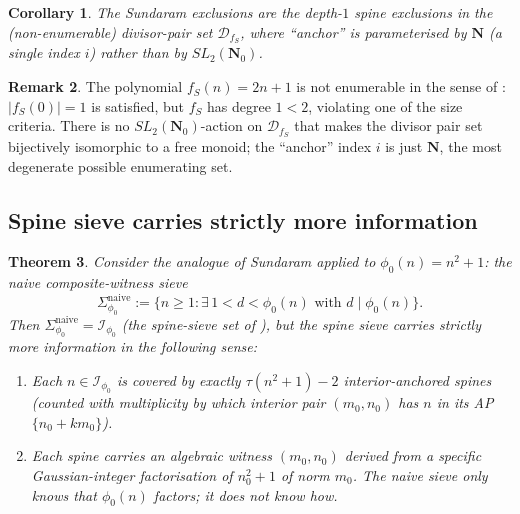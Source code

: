 \documentclass[11pt]{article}
\newtheorem{theorem}{Theorem}[section]
\newtheorem{corollary}[theorem]{Corollary}
\theoremstyle{definition}
\newtheorem{remark}[theorem]{Remark}
\newcommand{\N}{\mathbf{N}}
\newcommand{\Nz}{\mathbf{N}_0}
\newcommand{\SLNz}{SL_2(\Nz)}
\newcommand{\Iset}{\mathcal{I}_{\phi_0}}
\begin{document}
\begin{corollary}\label{cor:sundaram-as-spine}
The Sundaram exclusions are the depth-$1$ spine exclusions in the (non-enumerable) divisor-pair set $\mathcal{D}_{f_S}$, where ``anchor'' is parameterised by $\N$ (a single index $i$) rather than by $\SLNz$.
\end{corollary}

\begin{remark}\label{rem:non-enumerable}
The polynomial $f_S(n) = 2n+1$ is not enumerable in the sense of \cite[Defn.~2.1]{shakov}: $|f_S(0)| = 1$ is satisfied, but $f_S$ has degree $1 < 2$, violating one of the size criteria. There is no $\SLNz$-action on $\mathcal{D}_{f_S}$ that makes the divisor pair set bijectively isomorphic to a free monoid; the ``anchor'' index $i$ is just $\N$, the most degenerate possible enumerating set.
\end{remark}

\subsection{Spine sieve carries strictly more information}

\begin{theorem}\label{thm:spine-vs-sundaram}
Consider the analogue of Sundaram applied to $\phi_0(n) = n^2+1$: the naive composite-witness sieve
\[
\Sigma_{\phi_0}^{\mathrm{naive}} := \{n \ge 1 : \exists\, 1 < d < \phi_0(n) \text{ with } d \mid \phi_0(n)\}.
\]
Then $\Sigma_{\phi_0}^{\mathrm{naive}} = \Iset$ (the spine-sieve set of \cite[Defn.~3.4]{B8}), but the spine sieve carries strictly more information in the following sense:
\begin{enumerate}
\item Each $n \in \Iset$ is covered by exactly $\tau(n^2+1) - 2$ interior-anchored spines (counted with multiplicity by which interior pair $(m_0, n_0)$ has $n$ in its AP $\{n_0 + km_0\}$).
\item Each spine carries an algebraic witness $(m_0, n_0)$ derived from a specific Gaussian-integer factorisation of $n_0^2+1$ of norm $m_0$. The naive sieve only knows that $\phi_0(n)$ factors; it does not know \emph{how}.
\end{enumerate}
\end{theorem}
\end{document}
